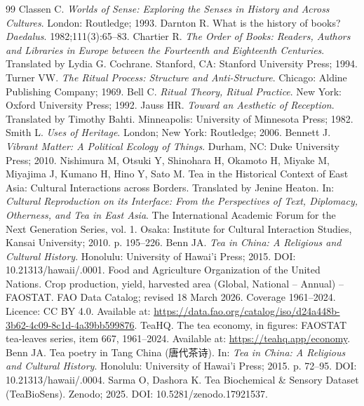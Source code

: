 \documentclass[numbers]{IntechOpen-Book}
\newcommand{\zh}[1]{{\CJKfontspec{Noto Serif CJK SC}\upshape #1}}
\begin{document}
\begin{backmatter}
\begin{thebibliography}{99}
 Classen C. \textit{Worlds of Sense: Exploring the Senses in History and Across Cultures}. London: Routledge; 1993.
 Darnton R. What is the history of books? \textit{Daedalus}. 1982;111(3):65--83.
 Chartier R. \textit{The Order of Books: Readers, Authors and Libraries in Europe between the Fourteenth and Eighteenth Centuries}. Translated by Lydia G. Cochrane. Stanford, CA: Stanford University Press; 1994.
 Turner VW. \textit{The Ritual Process: Structure and Anti-Structure}. Chicago: Aldine Publishing Company; 1969.
 Bell C. \textit{Ritual Theory, Ritual Practice}. New York: Oxford University Press; 1992.
 Jauss HR. \textit{Toward an Aesthetic of Reception}. Translated by Timothy Bahti. Minneapolis: University of Minnesota Press; 1982. Smith L. \textit{Uses of Heritage}. London; New York: Routledge; 2006.
 Bennett J. \textit{Vibrant Matter: A Political Ecology of Things}. Durham, NC: Duke University Press; 2010.
 Nishimura M, Otsuki Y, Shinohara H, Okamoto H, Miyake M, Miyajima J, Kumano H, Hino Y, Sato M. Tea in the Historical Context of East Asia: Cultural Interactions across Borders. Translated by Jenine Heaton. In: \textit{Cultural Reproduction on its Interface: From the Perspectives of Text, Diplomacy, Otherness, and Tea in East Asia}. The International Academic Forum for the Next Generation Series, vol. 1. Osaka: Institute for Cultural Interaction Studies, Kansai University; 2010. p. 195--226.
 Benn JA. \textit{Tea in China: A Religious and Cultural History}. Honolulu: University of Hawai'i Press; 2015. DOI: 10.21313/hawaii/.0001.
 Food and Agriculture Organization of the United Nations. Crop production, yield, harvested area (Global, National -- Annual) -- FAOSTAT. FAO Data Catalog; revised 18 March 2026. Coverage 1961--2024. Licence: CC BY 4.0. Available at: \url{https://data.fao.org/catalog/iso/d24a448b-3b62-4c09-8c1d-4a39bb599876}.
 TeaHQ. The tea economy, in figures: FAOSTAT tea-leaves series, item 667, 1961--2024. Available at: \url{https://teahq.app/economy}.
 Benn JA. Tea poetry in Tang China (\zh{唐代茶诗}). In: \textit{Tea in China: A Religious and Cultural History}. Honolulu: University of Hawai'i Press; 2015. p. 72--95. DOI: 10.21313/hawaii/.0004.
 Sarma O, Dashora K. Tea Biochemical \& Sensory Dataset (TeaBioSens). Zenodo; 2025. DOI: 10.5281/zenodo.17921537.

\end{thebibliography}
\end{backmatter}
\end{document}

